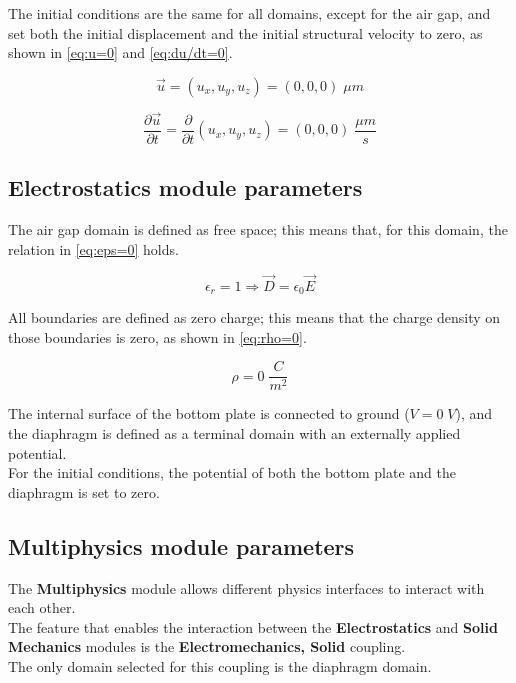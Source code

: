 \newpage
\noindent
The initial conditions are the same for all domains, except for the air gap, and set both the initial displacement and the initial structural velocity to zero, as shown in \cref{eq:u=0} and \cref{eq:du/dt=0}.

\begin{equation}
    \vec{u} = (u_x, u_y, u_z) = (0, 0, 0) \; \mu m
    \label{eq:u=0}
\end{equation}

\begin{equation}
    \frac{\partial \vec{u}}{\partial t} = \frac{\partial}{\partial t}(u_x, u_y, u_z) = (0, 0, 0) \; \frac{\mu m}{s}
    \label{eq:du/dt=0}
\end{equation}

\subsection{Electrostatics module parameters}

The air gap domain is defined as free space; this means that, for this domain, the relation in \cref{eq:eps=0} holds.

\begin{equation}
    \epsilon_r = 1 \Rightarrow
    \vec{D} = \epsilon_0 \vec{E}
    \label{eq:eps=0}
\end{equation}

\noindent
All boundaries are defined as zero charge; this means that the charge density on those boundaries is zero, as shown in \cref{eq:rho=0}.

\begin{equation}
    \rho = 0 \; \frac{C}{m^2}
    \label{eq:rho=0}
\end{equation}

\noindent
The internal surface of the bottom plate is connected to ground (\(V = 0 \; V\)), and the diaphragm is defined as a terminal domain with an externally applied potential. \\
For the initial conditions, the potential of both the bottom plate and the diaphragm is set to zero.

\subsection{Multiphysics module parameters}

The \textbf{Multiphysics} module allows different physics interfaces to interact with each other. \\
The feature that enables the interaction between the \textbf{Electrostatics} and \textbf{Solid Mechanics} modules is the \textbf{Electromechanics, Solid} coupling. \\
The only domain selected for this coupling is the diaphragm domain.

